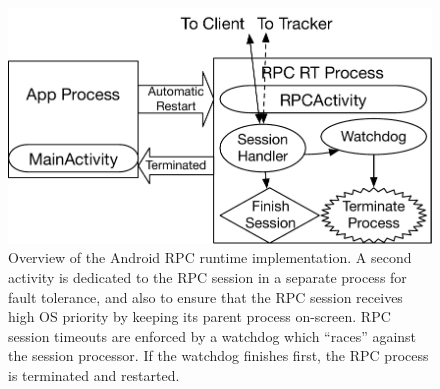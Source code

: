 \begin{figure}[t!]
\includegraphics[width=\textwidth]{sys_diagrams/android.pdf}
\caption{Overview of the Android RPC runtime implementation.
  A second activity is dedicated to the RPC session in a separate process for fault tolerance, and also to ensure that the RPC session receives high OS priority by keeping its parent process on-screen. RPC session timeouts are enforced by a watchdog which ``races'' against the session processor.
  If the watchdog finishes first, the RPC process is terminated and restarted.}
\label{fig:android}
\end{figure}

